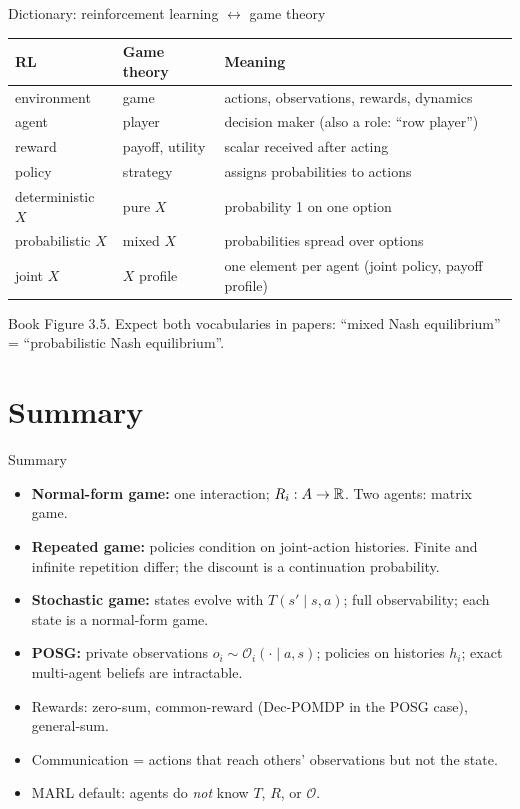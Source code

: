 \documentclass[aspectratio=169,11pt]{beamer}
\begin{document}
\begin{frame}{Dictionary: reinforcement learning $\leftrightarrow$ game theory}
  \begin{center}
    \small
    \begin{tabular}{@{}lll@{}}
      \toprule
      RL & Game theory & Meaning \\
      \midrule
      environment & game & actions, observations, rewards, dynamics \\
      agent & player & decision maker (also a role: ``row player'') \\
      reward & payoff, utility & scalar received after acting \\
      policy & strategy & assigns probabilities to actions \\
      deterministic $X$ & pure $X$ & probability 1 on one option \\
      probabilistic $X$ & mixed $X$ & probabilities spread over options \\
      joint $X$ & $X$ profile & one element per agent (joint policy, payoff profile) \\
      \bottomrule
    \end{tabular}
  \end{center}
  \medskip
  \small Book Figure 3.5. Expect both vocabularies in papers: ``mixed Nash equilibrium'' = ``probabilistic Nash equilibrium''.
\end{frame}

\section{Summary}

\begin{frame}{Summary}
  \begin{itemize}
    \item \textbf{Normal-form game:} one interaction; $R_i : A \to \mathbb{R}$. Two agents: matrix game.
    \item \textbf{Repeated game:} policies condition on joint-action histories. Finite and infinite repetition differ; the discount is a continuation probability.
    \item \textbf{Stochastic game:} states evolve with $T(s' \mid s, a)$; full observability; each state is a normal-form game.
    \item \textbf{POSG:} private observations $o_i \sim \mathcal{O}_i(\cdot \mid a, s)$; policies on histories $h_i$; exact multi-agent beliefs are intractable.
    \item Rewards: zero-sum, common-reward (Dec-POMDP in the POSG case), general-sum.
    \item Communication = actions that reach others' observations but not the state.
    \item MARL default: agents do \emph{not} know $T$, $R$, or $\mathcal{O}$.
  \end{itemize}
  \bigskip
  \centering
  
\end{frame}
\end{document}
